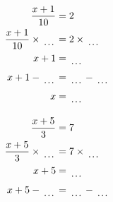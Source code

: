 \documentclass[12pt]{article}
\newcounter{minipagecount}
\begin{document}
\begin{multicols}{2}
\begin{minipage}[t]{0.45\textwidth}
    \raggedright %
    \begin{align*} %
        \frac{x + 1}{10} &= 2\\
        \frac{x + 1}{10} \times\dotuline{\hspace{5mm}} &= 2 \times\dotuline{\hspace{5mm}}\\
        x + 1 &= \dotuline{\hspace{5mm}}\\
        x + 1 - \dotuline{\hspace{5mm}} &= \dotuline{\hspace{5mm}} - \dotuline{\hspace{5mm}}\\
        x &= \dotuline{\hspace{5mm}}\\
    \end{align*}
\end{minipage} %
\noindent{(\theminipagecount)}\hspace{0.1mm} %
\begin{minipage}[t]{0.45\textwidth} %
    \vspace{-26pt}  %
    \raggedright %
    \begin{align*} %
        \frac{x + 5}{3} &= 7\\
        \frac{x + 5}{3} \times\dotuline{\hspace{5mm}} &= 7 \times\dotuline{\hspace{5mm}}\\
        x + 5 &= \dotuline{\hspace{5mm}}\\
        x + 5 - \dotuline{\hspace{5mm}} &= \dotuline{\hspace{5mm}} - \dotuline{\hspace{5mm}}\\

\end{align*}
\end{minipage}
\end{multicols}
\end{document}
